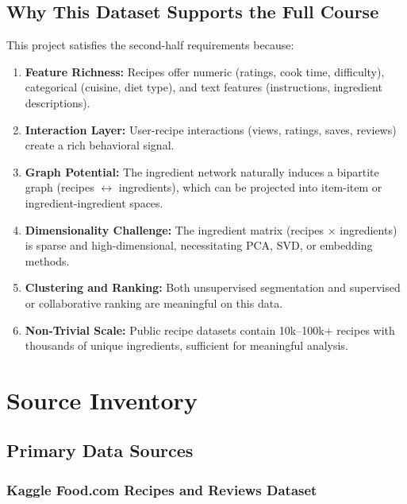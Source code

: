 \documentclass[11pt,a4paper]{article}
\begin{document}
\subsection{Why This Dataset Supports the Full Course}

This project satisfies the second-half requirements because:

\begin{enumerate}
    \item \textbf{Feature Richness:} Recipes offer numeric (ratings, cook time, difficulty), categorical (cuisine, diet type), and text features (instructions, ingredient descriptions).
    \item \textbf{Interaction Layer:} User-recipe interactions (views, ratings, saves, reviews) create a rich behavioral signal.
    \item \textbf{Graph Potential:} The ingredient network naturally induces a bipartite graph (recipes $\leftrightarrow$ ingredients), which can be projected into item-item or ingredient-ingredient spaces.
    \item \textbf{Dimensionality Challenge:} The ingredient matrix (recipes $\times$ ingredients) is sparse and high-dimensional, necessitating PCA, SVD, or embedding methods.
    \item \textbf{Clustering and Ranking:} Both unsupervised segmentation and supervised or collaborative ranking are meaningful on this data.
    \item \textbf{Non-Trivial Scale:} Public recipe datasets contain 10k--100k+ recipes with thousands of unique ingredients, sufficient for meaningful analysis.
\end{enumerate}

\newpage

\section{Source Inventory}

\subsection{Primary Data Sources}

\subsubsection{Kaggle Food.com Recipes and Reviews Dataset}
\end{document}

